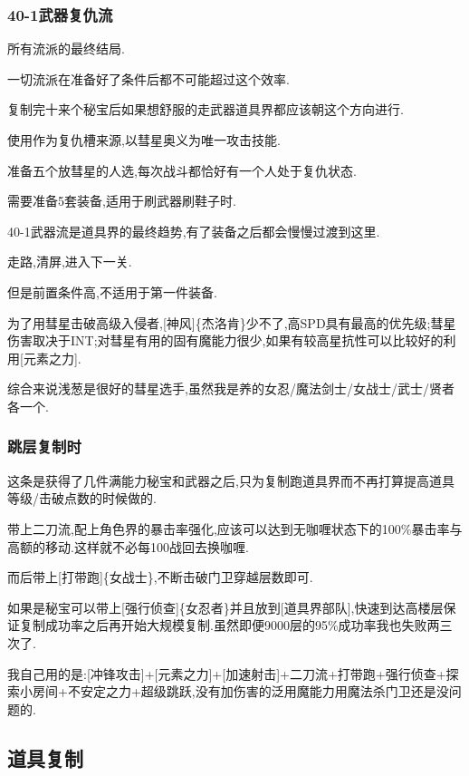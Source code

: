 		{\color{red}{仍然是击破道具神的最低要求打法,参考实用魔能力章节}}

		\subsubsection{40-1武器复仇流}

		所有流派的最终结局.

		一切流派在准备好了条件后都不可能超过这个效率.

		复制完十来个秘宝后如果想舒服的走武器道具界都应该朝这个方向进行.

		使用{\color{red}{40-1武器}}作为复仇槽来源,以彗星奥义为唯一攻击技能.

		准备五个放彗星的人选,每次战斗都恰好有一个人处于复仇状态.

		需要准备5套装备,适用于刷武器刷鞋子时.

		40-1武器流是道具界的最终趋势,有了装备之后都会慢慢过渡到这里.

		走路,清屏,进入下一关.

		但是前置条件高,不适用于第一件装备.

		为了用彗星击破高级入侵者,[神风]\{杰洛肯\}少不了,高SPD具有最高的优先级;彗星伤害取决于INT;对彗星有用的固有魔能力很少,如果有较高星抗性可以比较好的利用[元素之力].

		综合来说浅葱是很好的彗星选手,虽然我是养的女忍/魔法剑士/女战士/武士/贤者各一个.

		\newpage
		
		\subsubsection{跳层复制时}

		这条是获得了几件满能力秘宝和武器之后,只为复制跑道具界而不再打算提高道具等级/击破点数的时候做的.

		带上二刀流,配上角色界的暴击率强化,应该可以达到无咖喱状态下的100\%暴击率与高额的移动.这样就不必每100战回去换咖喱.

		而后带上[打带跑]\{女战士\},不断击破门卫穿越层数即可.

		如果是秘宝可以带上[强行侦查]\{女忍者\}并且放到[道具界部队],快速到达高楼层保证复制成功率之后再开始大规模复制.虽然即便9000层的95\%成功率我也失败两三次了.

		我自己用的是:[冲锋攻击]+[元素之力]+[加速射击]+二刀流+打带跑+强行侦查+探索小房间+不安定之力+超级跳跃,没有加伤害的泛用魔能力用魔法杀门卫还是没问题的.

	\newpage

	\subsection{道具复制}

